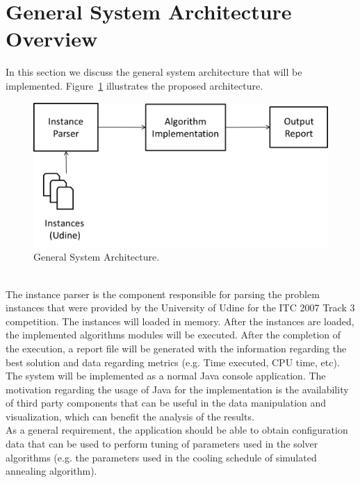 \section{General System Architecture Overview}
\label{subsubsec:solution-architecture-overview}
In this section we discuss the general system architecture that will be implemented. Figure~\ref{fig:systemArchitecture} illustrates the proposed architecture.\\
\begin{figure}[h!]
 \centering
   \includegraphics[width=15cm]{./images/figures/Fig4_SystemArchitecture.png}
   \caption{General System Architecture.}
   \label{fig:systemArchitecture}
\end{figure}\\
The instance parser is the component responsible for parsing the problem instances that were provided by the University of Udine for the ITC 2007 Track 3 competition. The instances will loaded in memory. After the instances are loaded, the implemented algorithms modules will be executed. After the completion of the execution, a report file will be generated with the information regarding the best solution and data regarding metrics (e.g. Time executed, CPU time, etc).\\
The system will be implemented as a normal Java console application. The motivation regarding the usage of Java for the implementation is the availability of third party components that can be useful in the data manipulation and visualization, which can benefit the analysis of the results.\\
As a general requirement, the application should be able to obtain configuration data that can be used to perform tuning of parameters used in the solver algorithms (e.g. the parameters used in the cooling schedule of simulated annealing algorithm).
